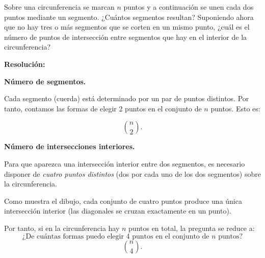 \documentclass[a4paper,12pt]{article}
\begin{document}
\begin{ejercicio}[title=Ejercicio 44]
Sobre una circunferencia se marcan $n$ puntos y a continuación se unen cada dos puntos mediante un segmento.  
¿Cuántos segmentos resultan?  
Suponiendo ahora que no hay tres o más segmentos que se corten en un mismo punto, ¿cuál es el número de puntos de intersección entre segmentos que hay en el interior de la circunferencia?

\tcblower
\textbf{Resolución:}

\vspace{0.5em}

\textbf{Número de segmentos.}

Cada segmento (cuerda) está determinado por un par de puntos distintos. Por tanto, contamos las formas de elegir 2 puntos en el conjunto de $n$ puntos. Esto es:

\[
\boxed{\binom{n}{2}}.
\]

\textbf{Número de intersecciones interiores.}

Para que aparezca una intersección interior entre dos segmentos, es necesario disponer de \emph{cuatro puntos distintos} (dos por cada uno de los dos segmentos) sobre la circunferencia.

\begin{center}
\end{center}

Como muestra el dibujo, cada conjunto de cuatro puntos produce una única intersección interior (las diagonales se cruzan exactamente en un punto).

Por tanto, si en la circunferencia hay $n$ puntos en total, la pregunta se reduce a:
\[
\text{¿De cuántas formas puedo elegir 4 puntos en el conjunto de $n$ puntos?}
\]
\[
\boxed{\binom{n}{4}}.
\]

\end{ejercicio}
\end{document}
